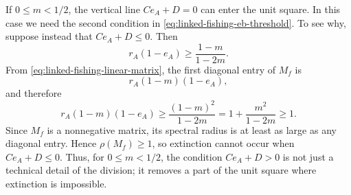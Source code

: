 \documentclass{article}
\numberwithin{equation}{section}
\begin{document}
If $0\leq m<1/2$, the vertical line $Ce_A+D=0$ can enter the unit square.
In this case we need the second condition in
\eqref{eq:linked-fishing-eb-threshold}. To see why, suppose instead that
$Ce_A+D\leq0$. Then
\begin{equation*}
    r_A(1-e_A)\geq\frac{1-m}{1-2m}.
\end{equation*}
From \eqref{eq:linked-fishing-linear-matrix}, the first diagonal entry of
$M_f$ is
\begin{equation*}
    r_A(1-m)(1-e_A),
\end{equation*}
and therefore
\begin{equation*}
    r_A(1-m)(1-e_A)
    \geq
    \frac{(1-m)^2}{1-2m}
    =
    1+\frac{m^2}{1-2m}
    \geq1.
\end{equation*}
Since $M_f$ is a nonnegative matrix, its spectral radius is at least as
large as any diagonal entry. Hence $\rho(M_f)\geq1$, so extinction
cannot occur when $Ce_A+D\leq0$. Thus, for $0\leq m<1/2$, the condition
$Ce_A+D>0$ is not just a technical detail of the division; it removes a
part of the unit square where extinction is impossible.
\end{document}
